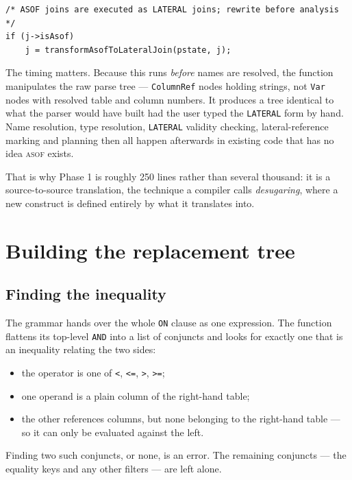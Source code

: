 \documentclass[11pt,a4paper]{article}
\newcommand{\code}[1]{\texttt{\small #1}}
\newcommand{\asof}{{\normalfont\scshape asof}}
\begin{document}
\begin{lstlisting}[style=cstyle]
/* ASOF joins are executed as LATERAL joins; rewrite before analysis */
if (j->isAsof)
    j = transformAsofToLateralJoin(pstate, j);
\end{lstlisting}

The timing matters. Because this runs \emph{before} names are resolved, the function
manipulates the raw parse tree — \code{ColumnRef} nodes holding strings, not \code{Var}
nodes with resolved table and column numbers. It produces a tree identical to what the
parser would have built had the user typed the \code{LATERAL} form by hand. Name
resolution, type resolution, \code{LATERAL} validity checking, lateral-reference marking
and planning then all happen afterwards in existing code that has no idea \asof{} exists.

That is why Phase 1 is roughly 250 lines rather than several thousand: it is a
source-to-source translation, the technique a compiler calls \emph{desugaring}, where a new
construct is defined entirely by what it translates into.

\section{Building the replacement tree}

\subsection*{Finding the inequality}

The grammar hands over the whole \code{ON} clause as one expression. The function flattens
its top-level \code{AND} into a list of conjuncts and looks for exactly one that is an
inequality relating the two sides:

\begin{itemize}[nosep,leftmargin=*]
\item the operator is one of \code{<}, \code{<=}, \code{>}, \code{>=};
\item one operand is a plain column of the right-hand table;
\item the other references columns, but none belonging to the right-hand table — so it can
      only be evaluated against the left.
\end{itemize}

Finding two such conjuncts, or none, is an error. The remaining conjuncts — the equality
keys and any other filters — are left alone.
\end{document}

